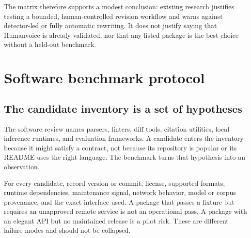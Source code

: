 The matrix therefore supports a modest conclusion: existing research justifies
testing a bounded, human-controlled revision workflow and warns against
detector-led or fully automatic rewriting. It does not justify saying that
Humanvoice is already validated, nor that any listed package is the best
choice without a held-out benchmark.

\section{Software benchmark protocol}
\label{app:software-benchmark}

\subsection{The candidate inventory is a set of hypotheses}

The software review names parsers, linters, diff tools, citation utilities,
local inference runtimes, and evaluation frameworks. A candidate enters the
inventory because it might satisfy a contract, not because its repository is
popular or its README uses the right language. The benchmark turns that
hypothesis into an observation.

For every candidate, record version or commit, license, supported formats,
runtime dependencies, maintenance signal, network behavior, model or corpus
provenance, and the exact interface used. A package that passes a fixture but
requires an unapproved remote service is not an operational pass. A package
with an elegant API but no maintained release is a pilot risk. These are
different failure modes and should not be collapsed.


